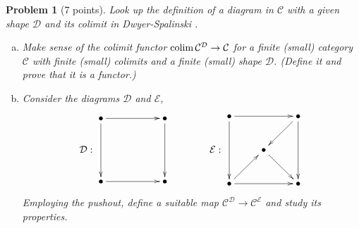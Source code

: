 \documentclass[12pt]{article}
\newcommand\EEE{\mathcal{E}}
\newcommand\CCC{\mathcal{C}}
\newcommand\DDD{\mathcal{D}}
\newcommand\colim{\qopname\relax n{colim}}
\newtheorem{problem}{Problem}}
\begin{document}
\begin{problem}[7 points]
  Look up the definition of a {\it diagram} in $\CCC$ with a given {\it shape} $\DDD$ and its colimit in Dwyer-Spalinski \cite{d-s}.
  \begin{enumerate}[(a)]
  \item   Make sense of the colimit functor $\colim\CCC^\DDD\to\CCC$ for a finite (small) category $\CCC$
    with finite (small) colimits and a finite (small) shape $\DDD$. (Define it and prove that it is a functor.)
  \item Consider the diagrams $\DDD$ and $\EEE$,
    \begin{equation*}
      \DDD:
      \vcenter{\xymatrix{
        {\bullet} \ar[rr]
                  \ar[dd] & &
        {\bullet} \ar[dd] \\
        & & \\
        {\bullet} \ar[rr] & &
        {\bullet}
      }}
      \qquad\qquad
      \EEE:
      \vcenter{\xymatrix{
        {\bullet} \ar[rr]
                  \ar[dd] & &
        {\bullet} \ar[dd] \ar[ld] \\
        & {\bullet} \ar[rd] & \\
        {\bullet} \ar[rr] \ar[ur] & &
        {\bullet}
      }}
    \end{equation*}
    Employing the pushout, define a suitable map $\CCC^\DDD\to\CCC^\EEE$ and study its properties.
  \end{enumerate}
\end{problem}
\end{document}
